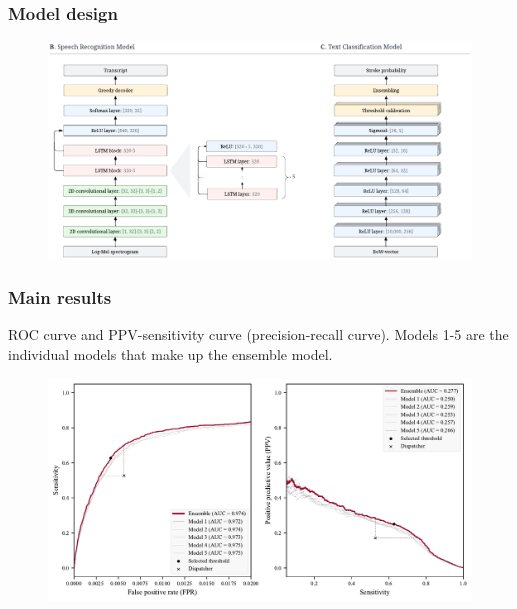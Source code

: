 \begin{frame}
    \frametitle{Model design}
    \begin{figure}
        \centering
        \includegraphics[width=0.70\paperwidth]{../graphics/paper_retrospective/model_sketch-bottom-part.pdf}
    \end{figure}

\end{frame}


\begin{frame}
    \frametitle{Main results}
    ROC curve and PPV-sensitivity curve (precision-recall curve). Models 1-5 are the individual models that make up the ensemble model.
    \begin{figure}
        \centering
        \includegraphics[width=0.65\paperwidth]{../graphics/paper_retrospective/figure1.pdf}
    \end{figure}
\end{frame}


